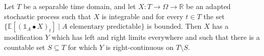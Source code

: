 \begin{theorem}\label{thm:exists_rightContinuous_modification_of_bounded_elemStochIntegral}
Let $T$ be a separable time domain, and let $X : T \to \Omega \to \mathbb{R}$ be an adapted stochastic process such that $X$ is integrable and for every $t \in T$ the set $\{\mathbb{E}[(\mathbb{1}_A \bullet X)_t] \mid A \text{ elementary predictable}\}$ is bounded.
Then $X$ has a modification $Y$ which has left and right limits everywhere and such that there is a countable set $S \subseteq T$ for which $Y$ is right-continuous on $T \setminus S$.
\end{theorem}

